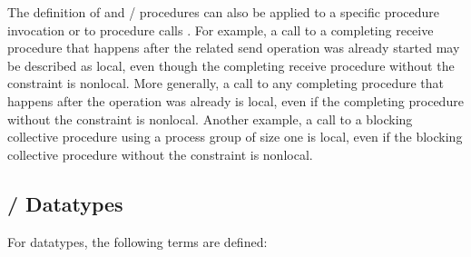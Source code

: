 The definition of
and
\MPI/ procedures
can also be applied to a specific procedure invocation or to procedure calls .
For example, a call to a completing receive procedure that happens after the related
send operation was already started may be described as local, even though the completing receive procedure without the constraint is nonlocal.
More generally, a call to any completing procedure that happens after the operation was already
is local, even if the completing procedure without the constraint is nonlocal.
Another example, a call to a blocking collective procedure using a process group of size one is local, even if the blocking collective procedure without the constraint is nonlocal.

\subsection{\texorpdfstring{\MPI/}{MPI} Datatypes}
\label{terms:datatypes}
For datatypes, the following terms are defined:

